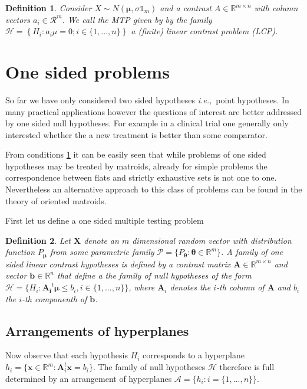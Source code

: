 \documentclass[a4paper,12pt]{article}
\newtheorem{definition}{Definition}
\newcommand{\bs}[1]{\boldsymbol{#1}}
\newcommand{\ie}{{\em i.e.,}~}
\begin{document}
\begin{definition}
  Consider $X \sim N(\bs{\mu},\sigma \mathbb{1}_m)$ and a contrast $A
  \in \mathbb{R}^{m \times n}$ with column vectors $a_i \in
  \mathcal{R}^m$. We call the MTP given by by the family $\mathcal{H}
  = \left\{H_i: a_i\mu = 0; i \in \{1,...,n\}\right\}$ a (finite)
  linear  contrast problem (LCP).
\end{definition}


\section{One sided problems}

So far we have only considered two sided hypotheses \ie point
hypotheses. In many practical applications however the questions of
interest are better addressed by one sided null hypotheses. For
example in a clinical trial one generally only interested whether the
a new treatment is better than some comparator. 

From conditions \ref{} it can be easily seen that while problems of
one sided hypotheses may be treated by matroids, already for simple
problems the correspondence between flats and strictly exhaustive sets
is not one to one. Nevertheless an alternative approach to this class
of problems can be found in the theory of oriented matroids.

First let us define a one sided multiple testing problem

\begin{definition}
  Let $\bs{X}$ denote an $m$ dimensional random vector with
  distribution function $P_{\bs{\mu}}$ from some parametric family
  $\mathscr{P} = \{P_{\bs{\theta}}: \bs{\theta} \in \mathbb{R}^m\}$. A
  family of {\em one sided linear contrast hypotheses} is defined by a
  contrast matrix $\bs{A} \in \mathbb{R}^{m\times n}$ and vector
  $\bs{b} \in \mathbb{R}^n$ that define a the family of null
  hypotheses of the form $\mathscr{H} = \{H_i: \bs{A_i}^t\bs{\mu} \leq
  b_i,i \in \{1,...,n\}\}$, where $\bs{A}_i$ denotes the $i$-th column
  of $\bs{A}$ and $b_i$ the $i$-th componenth of $\bs{b}$.
\end{definition}

\subsection{Arrangements of hyperplanes}
\label{sec:hyperplanes}

Now observe that each hypothesis $H_i$ corresponds to a hyperplane
$h_i = \{\bs{x} \in \mathbb{R}^m: \bs{A}_i^t\bs{x} = b_i\}$. The
family of null hypotheses $\mathscr{H}$ therefore is full determined
by an arrangement of hyperplanes $\mathscr{A} = \{h_i:i=
\{1,...,n\}\}$. 
\end{document}

